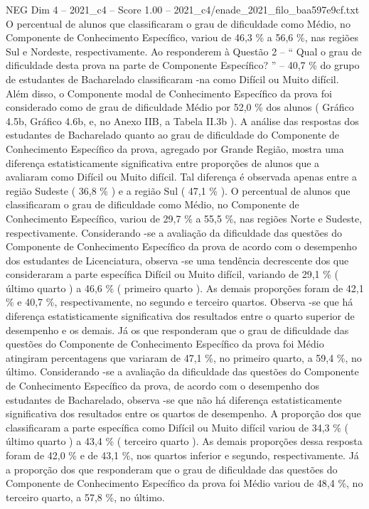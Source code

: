 \begin{textsample}{NEG Dim 4 – 2021\_c4 – Score 1.00 – 2021\_c4/enade\_2021\_filo\_baa597e9cf.txt}
O percentual de alunos que classificaram o grau de dificuldade como Médio, no Componente de Conhecimento Específico, variou de 46,3 \% a 56,6 \%, nas regiões Sul e Nordeste, respectivamente.
Ao responderem à Questão 2 – “ Qual o grau de dificuldade desta prova na parte de Componente Específico? ” – 40,7 \% do grupo de estudantes de Bacharelado classificaram -na como Difícil ou Muito difícil.
Além disso, o Componente modal de Conhecimento Específico da prova foi considerado como de grau de dificuldade Médio por 52,0 \% dos alunos ( Gráfico 4.5b, Gráfico 4.6b, e, no Anexo IIB, a Tabela II.3b ).
A análise das respostas dos estudantes de Bacharelado quanto ao grau de dificuldade do Componente de Conhecimento Específico da prova, agregado por Grande Região, mostra uma diferença estatisticamente significativa entre proporções de alunos que a avaliaram como Difícil ou Muito difícil.
Tal diferença é observada apenas entre a região Sudeste ( 36,8 \% ) e a região Sul ( 47,1 \% ).
O percentual de alunos que classificaram o grau de dificuldade como Médio, no Componente de Conhecimento Específico, variou de 29,7 \% a 55,5 \%, nas regiões Norte e Sudeste, respectivamente.
Considerando -se a avaliação da dificuldade das questões do Componente de Conhecimento Específico da prova de acordo com o desempenho dos estudantes de Licenciatura, observa -se uma tendência decrescente dos que consideraram a parte específica Difícil ou Muito difícil, variando de 29,1 \% ( último quarto ) a 46,6 \% ( primeiro quarto ).
As demais proporções foram de 42,1 \% e 40,7 \%, respectivamente, no segundo e terceiro quartos.
Observa -se que há diferença estatisticamente significativa dos resultados entre o quarto superior de desempenho e os demais.
Já os que responderam que o grau de dificuldade das questões do Componente de Conhecimento Específico da prova foi Médio atingiram percentagens que variaram de 47,1 \%, no primeiro quarto, a 59,4 \%, no último.
Considerando -se a avaliação da dificuldade das questões do Componente de Conhecimento Específico da prova, de acordo com o desempenho dos estudantes de Bacharelado, observa -se que não há diferença estatisticamente significativa dos resultados entre os quartos de desempenho.
A proporção dos que classificaram a parte específica como Difícil ou Muito difícil variou de 34,3 \% ( último quarto ) a 43,4 \% ( terceiro quarto ).
As demais proporções dessa resposta foram de 42,0 \% e de 43,1 \%, nos quartos inferior e segundo, respectivamente.
Já a proporção dos que responderam que o grau de dificuldade das questões do Componente de Conhecimento Específico da prova foi Médio variou de 48,4 \%, no terceiro quarto, a 57,8 \%, no último.

\end{textsample}
